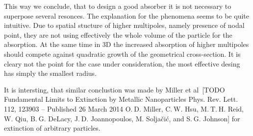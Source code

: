 \documentclass[aps,prl,twocolumn,showpacs,superscriptaddress,groupedaddress]{revtex4-1}
\begin{document}

This way we conclude, that to design a good absorber it is not
necessary to superpose several resonces.  The explanation for the
phenomena seems to be quite intuitive.  Due to spatial stucture of
higher multipoles, namely presence of nodal point, they are not using
effectively the whole volume of the particle for the absorption. At
the same time in 3D the increased absorption of higher multipoles should
compete against quadratic growth of the geometrical cross-section.  It
is cleary not the point for the case under consideration, the most
effective desing has simply the smallest radius.


It is intersting, that similar conclustion was made by Miller et
al~[TODO Fundamental Limits to Extinction by Metallic Nanoparticles
Phys. Rev. Lett. 112, 123903 – Published 26 March 2014 O. D. Miller,
C. W. Hsu, M. T. H. Reid, W. Qiu, B. G. DeLacy, J. D. Joannopoulos,
M. Soljačić, and S. G. Johnson] for extinction of arbitrary particles.



\end{document}
